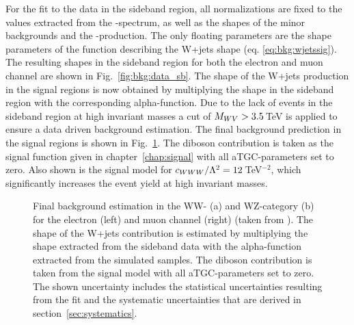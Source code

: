 \noindent For the fit to the data in the sideband region, all normalizations are fixed to the values extracted from the \Mpr -spectrum, as well as the shapes of the minor backgrounds and the \ttbar -production. The only floating parameters are the shape parameters of the function describing the W+jets shape (eq. \ref{eq:bkg:wjetssig}). The resulting shapes in the sideband region for both the electron and muon channel are shown in Fig.~\ref{fig:bkg:data_sb}. The shape of the W+jets production in the signal regions is now obtained by multiplying the shape in the sideband region with the corresponding alpha-function. Due to the lack of events in the sideband region at high invariant masses a cut of $M_{WV} > 3.5$\,TeV is applied to ensure a data driven background estimation. The final background prediction in the signal regions is shown in Fig.~\ref{fig:bkg:mwv_final}. The diboson contribution is taken as the signal function given in chapter~\ref{chap:signal} with all aTGC-parameters set to zero. Also shown is the signal model for $c_{WWW}/\Lambda^2 = 12$\,TeV$^{-2}$, which significantly increases the event yield at high invariant masses.
 \begin{figure}
	\centering
	\caption[Final background estimation in the WW- and WZ-category for the electron and muon channel]{Final background estimation in the WW- (a) and WZ-category (b) for the electron (left) and muon channel (right) (taken from \cite{PAS}). The shape of the W+jets contribution is estimated by multiplying the shape extracted from the sideband data with the alpha-function extracted from the simulated samples. The diboson contribution is taken from the signal model with all aTGC-parameters set to zero. The shown uncertainty includes the statistical uncertainties resulting from the fit and the systematic uncertainties that are derived in section~\ref{sec:systematics}.}
	\label{fig:bkg:mwv_final}
\end{figure}


